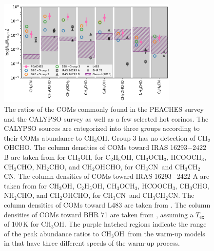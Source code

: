 \documentclass[twocolumn]{aastex62}
\newcommand{\methylformate}{\mbox{HCOOCH$_{3}$}}
\newcommand{\methanol}{\mbox{CH$_{3}$OH}}
\newcommand{\dimethylether}{\mbox{CH$_{3}$OCH$_{3}$}}
\newcommand{\ethanol}{\mbox{C$_{2}$H$_{5}$OH}}
\newcommand{\acetaldehyde}{\mbox{CH$_{3}$CHO}}
\newcommand{\ethylcyanide}{\mbox{CH$_{3}$CH$_{2}$CN}}
\newcommand{\methylcyanide}{\mbox{CH$_{3}$CN}}
\newcommand{\glycolaldehyde}{\mbox{CH$_{2}$OHCHO}}
\newcommand{\formamide}{\mbox{NH$_{2}$CHO}}
\begin{document}
\begin{figure}[htbp!]
  \centering
  \includegraphics[width=0.8\textwidth]{ratios_survey_all.pdf}
  \caption{The ratios of the COMs commonly found in the PEACHES survey and the CALYPSO survey \citep{2020AA...635A.198B} as well as a few selected hot corinos.  The CALYPSO sources are categorized into three groups according to their COMs abundance to \methanol.  Group 3 has no detection of \glycolaldehyde.  The column densities of COMs toward IRAS 16293$-$2422 B are taken from \citet{2016AA...595A.117J} for \methanol, \citet{2018AA...620A.170J} for \ethanol, \dimethylether, \methylformate, \acetaldehyde, \formamide, and \glycolaldehyde, \citet{2018AA...616A..90C} for \methylcyanide\ and \ethylcyanide.  The column densities of COMs toward IRAS 16293$-$2422 A are taken from \citet{2020AA...635A..48M} for \methanol, \ethanol, \dimethylether, \methylformate, \acetaldehyde, \formamide, and \glycolaldehyde, \citet{2018AA...616A..90C} for \methylcyanide\ and \ethylcyanide.  The column densities of COMs toward L483 are taken from \citet{2019AA...629A..29J}.  The column densities of COMs toward BHR 71 are taken from \citet{2020ApJ...891...61Y}, assuming a $T_\text{ex}$ of 100\,K for \methanol.  The purple hatched regions indicate the range of the peak abundance ratios to \methanol\ from the warm-up models in \citet{2013ApJ...765...60G} that have three different speeds of the warm-up process.}
  \label{fig:ratios_all}
\end{figure}
\end{document}
